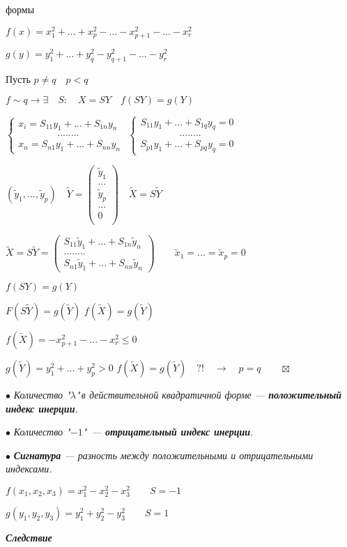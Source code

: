 \documentclass[a4paper, 12pt]{report}
\begin{document}
	 формы
	
	\quad$f(x)=x_1^2+...+x_p^2-...-x_{p+1}^2-...-x_r^2$
	
	\quad$g(y)=y_1^2+...+y_q^2-y_{q+1}^2-...-y_r^2$
	
	\quad Пусть $p\ne q \quad p<q$
	
	\quad $f \sim q \rightarrow \exists \quad S: \quad X=SY \quad f(SY)=g(Y)$
	
	\quad $\begin{cases}
		x_i=S_{11} y_1+...+S_{1n} y_n\\
		\qquad\qquad........\\
		x_n=S_{n1} y_1+...+S_{nn} y_n
	\end{cases}$ \quad \quad 
	$\begin{cases}
		S_{11} y_1+...+S_{1q} y_q=0\\
		\qquad\qquad........\\
		S_{p1} y_1+...+S_{pq} y_q=0
	\end{cases}$
	
	\quad $(\tilde y_1 ,..., \tilde y_p) \quad \tilde Y=
	\begin{pmatrix}
		\tilde y_1 \\
		...\\
		\tilde y_p\\
		...\\
		0\\
	\end{pmatrix} 
	\quad \tilde X=S \tilde Y$
	
	\quad $\tilde X=S \tilde Y=
	\begin{pmatrix}
		S_{11}\tilde y_1+...+S_{1n}\tilde y_n\\
		........\\
		S_{n1}\tilde y_1+...+S_{nn}\tilde y_n
	\end{pmatrix} \quad \quad \tilde x_1=...=\tilde x_p=0$
	
	\quad $f(SY)=g(Y)$
	
	\quad $F(S \tilde Y)=g(\tilde Y)$ \quad \quad $f(\tilde X)=g(\tilde Y)$
	
	\quad $f(\tilde X)=-x_{p+1}^2-...-x_r^2 \le 0$
	
	\quad$g(\tilde Y)=y_1^2+...+y_p^2>0$
	\quad $f(\tilde X)=g(\tilde Y) \quad ?! \quad \rightarrow \quad p=q \quad \quad \boxtimes$
	\par \bigskip
	$ \bullet $\textit{ Количество "$\lambda$"\,в действительной квадратичной форме --- \textbf{положительный индекс инерции}.} 
	\par \bigskip
	$\bullet$\textit{ Количество "$-1$"\, --- \textbf{отрицательный индекс инерции}.}
	\par \bigskip
	$\bullet$\textit{\textbf{ Сигнатура} --- разность между положительными и отрицательными индексами.}
	\par\bigskip 
	\quad $f(x_1,x_2,x_3)=x_1^2-x_2^2-x_3^2 \quad \quad S=-1$
	\par\bigskip 
	\quad $g(y_1,y_2,y_3)=y_1^2+y_2^2-y_3^2 \quad \quad S=1$
	\par \bigskip
	\textit{\textbf{Следствие}}
	
\end{document}
